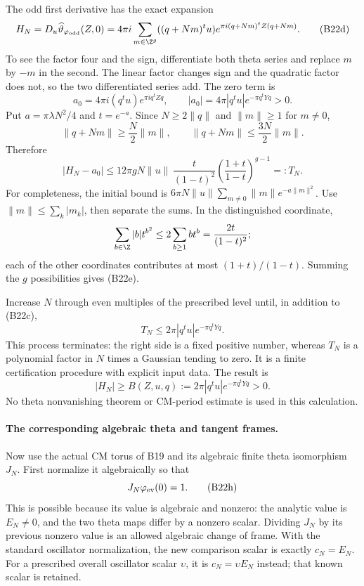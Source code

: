 The odd first derivative has the exact expansion
\[
 H_N=D_u\widehat\vartheta_{\varphi_{\rm odd}}(Z,0)
       =4\pi i\sum_{m\in\Z^g}
          ((q+Nm)^tu)e^{\pi i(q+Nm)^tZ(q+Nm)}.
 \tag{B22d}
\]
To see the factor four and the sign, differentiate both
theta series and replace $m$ by $-m$ in the second.  The
linear factor changes sign and the quadratic factor does
not, so the two differentiated series add.
The zero term is
\[
 a_0=4\pi i(q^tu)e^{\pi iq^tZq},\qquad
 |a_0|=4\pi|q^tu|e^{-\pi q^tYq}>0.
\]
Put $a=\pi\lambda N^2/4$ and $t=e^{-a}$.
Since $N\geq2\|q\|$ and $\|m\|\geq1$ for $m\ne0$,
\[
 \|q+Nm\|\geq\frac N2\|m\|,\qquad
 \|q+Nm\|\leq\frac{3N}{2}\|m\|.
\]
Therefore
\[
 |H_N-a_0|\leq
  12\pi gN\|u\|\,
       \frac{t}{(1-t)^2}
       \left(\frac{1+t}{1-t}\right)^{g-1}
       =:T_N.
 \tag{B22e}
\]
For completeness, the initial bound is
$6\pi N\|u\|\sum_{m\ne0}\|m\|e^{-a\|m\|^2}$.
Use $\|m\|\leq\sum_k|m_k|$, then separate the sums.
In the distinguished coordinate,
\[
 \sum_{b\in\Z}|b|t^{b^2}
       \leq2\sum_{b\geq1}bt^b
       =\frac{2t}{(1-t)^2};
\]
each of the other coordinates contributes at most
$(1+t)/(1-t)$.  Summing the $g$ possibilities gives (B22e).

Increase $N$ through even multiples of the prescribed level
until, in addition to (B22c),
\[
                 T_N\leq
                 2\pi|q^tu|e^{-\pi q^tYq}.
 \tag{B22f}
\]
This process terminates: the right side is a fixed positive
number, whereas $T_N$ is a polynomial factor in $N$ times a
Gaussian tending to zero.  It is a finite certification
procedure with explicit input data.  The result is
\[
 |H_N|\geq B(Z,u,q):=
               2\pi|q^tu|e^{-\pi q^tYq}>0.
 \tag{B22g}
\]
No theta nonvanishing theorem or CM-period estimate is used
in this calculation.

\paragraph{The corresponding algebraic theta and tangent frames.}
Now use the actual CM torus of B19 and its algebraic finite
theta isomorphism $J_N$.
First normalize it algebraically so that
\[
                         J_N\varphi_{\rm ev}(0)=1.
 \tag{B22h}
\]
This is possible because its value is algebraic and nonzero:
the analytic value is $E_N\ne0$, and the two theta maps differ
by a nonzero scalar.  Dividing $J_N$ by its previous nonzero
value is an allowed algebraic change of frame.  With the
standard oscillator normalization, the new comparison scalar
is exactly $c_N=E_N$.  For a prescribed overall oscillator
scalar $\upsilon$, it is $c_N=\upsilon E_N$ instead; that
known scalar is retained.

